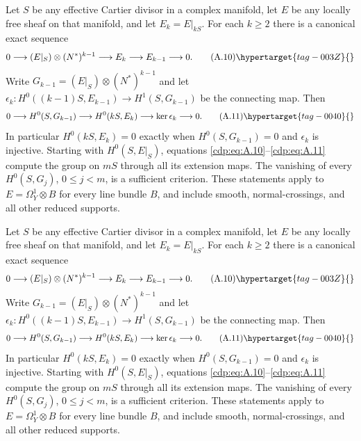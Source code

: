 \begin{proposition}\hypertarget{tag-01AL}{}\label{cdp:st:A.3.1}


Let $S$ be any effective Cartier divisor in a complex manifold, let $E$ be any locally free sheaf on that manifold, and let $E_k=E|_{kS}$. For each $k\ge2$ there is a canonical exact sequence
\[
0\longrightarrow (E|_S)\otimes(N^*)^{k-1}
 \longrightarrow E_k\longrightarrow E_{k-1}\longrightarrow0.
\tag{A.10}\hypertarget{tag-003Z}{}\label{cdp:eq:A.10}
\]
Write $G_{k-1}=(E|_S)\otimes(N^*)^{k-1}$ and let
$\epsilon_k:H^0((k-1)S,E_{k-1})\to H^1(S,G_{k-1})$
be the connecting map. Then
\[
0\longrightarrow H^0(S,G_{k-1})\longrightarrow H^0(kS,E_k)
 \longrightarrow\ker\epsilon_k\longrightarrow0.
\tag{A.11}\hypertarget{tag-0040}{}\label{cdp:eq:A.11}
\]
In particular $H^0(kS,E_k)=0$ exactly when $H^0(S,G_{k-1})=0$ and $\epsilon_k$ is injective. Starting with $H^0(S,E|_S)$, equations \eqref{cdp:eq:A.10}--\eqref{cdp:eq:A.11} compute the group on $mS$ through all its extension maps. The vanishing of every $H^0(S,G_j)$, $0\le j<m$, is a sufficient criterion. These statements apply to $E=\Omega_Y^1\otimes B$ for every line bundle $B$, and include smooth, normal-crossings, and all other reduced supports.
\end{proposition}

\begin{proposition}\hypertarget{tag-01AL}{}\label{cdp:st:A.3.1}


Let $S$ be any effective Cartier divisor in a complex manifold, let $E$ be any locally free sheaf on that manifold, and let $E_k=E|_{kS}$. For each $k\ge2$ there is a canonical exact sequence
\[
0\longrightarrow (E|_S)\otimes(N^*)^{k-1}
 \longrightarrow E_k\longrightarrow E_{k-1}\longrightarrow0.
\tag{A.10}\hypertarget{tag-003Z}{}\label{cdp:eq:A.10}
\]
Write $G_{k-1}=(E|_S)\otimes(N^*)^{k-1}$ and let
$\epsilon_k:H^0((k-1)S,E_{k-1})\to H^1(S,G_{k-1})$
be the connecting map. Then
\[
0\longrightarrow H^0(S,G_{k-1})\longrightarrow H^0(kS,E_k)
 \longrightarrow\ker\epsilon_k\longrightarrow0.
\tag{A.11}\hypertarget{tag-0040}{}\label{cdp:eq:A.11}
\]
In particular $H^0(kS,E_k)=0$ exactly when $H^0(S,G_{k-1})=0$ and $\epsilon_k$ is injective. Starting with $H^0(S,E|_S)$, equations \eqref{cdp:eq:A.10}--\eqref{cdp:eq:A.11} compute the group on $mS$ through all its extension maps. The vanishing of every $H^0(S,G_j)$, $0\le j<m$, is a sufficient criterion. These statements apply to $E=\Omega_Y^1\otimes B$ for every line bundle $B$, and include smooth, normal-crossings, and all other reduced supports.
\end{proposition}

